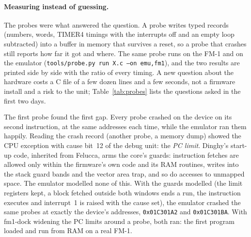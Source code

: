\documentclass[10pt,a4paper]{article}
\newcommand{\code}[1]{\texttt{#1}}
\begin{document}
\paragraph{Measuring instead of guessing.} The probes were what answered the question. A probe writes
typed records (numbers, words, TIMER4 timings with the interrupts off and an empty loop subtracted)
into a buffer in memory that survives a reset, so a probe that crashes still reports how far it got
and where. The same probe runs on the FM-1 and on the emulator (\code{tools/probe.py run X.c --on
emu,fm1}), and the two results are printed side by side with the ratio of every timing. A new
question about the hardware costs a C file of a few dozen lines and a few seconds, not a firmware
install and a risk to the unit; Table~\ref{tab:probes} lists the questions asked in the first two
days.

The first probe found the first gap. Every probe crashed on the device on its second instruction,
at the same addresses each time, while the emulator ran them happily. Reading the crash record
(another probe, a memory dump) showed the CPU exception with cause bit~12 of the debug unit: the
\emph{PC limit}. Dinghy's start-up code, inherited from Felucca, arms the core's guards: instruction
fetches are allowed only within the firmware's own code and its RAM routines, writes into the stack
guard bands and the vector area trap, and so do accesses to unmapped space. The emulator modelled
none of this. With the guards modelled (the limit registers kept, a block fetched outside both
windows ends a run, the instruction executes and interrupt~1 is raised with the cause set), the
emulator crashed the same probes at exactly the device's addresses, \code{0x01C301A2} and
\code{0x01C301BA}. With fm1-dock widening the PC limits around a probe, both ran: the first program
loaded and run from RAM on a real FM-1.
\end{document}
